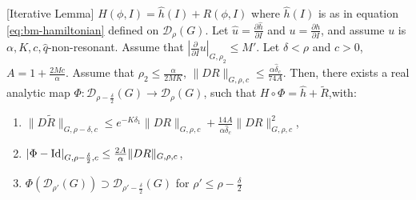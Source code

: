 \begin{theorem}\label{lemma:iterative}[Iterative Lemma] $H(\phi,I) = \hat h(I) + R(\phi,I)$ where $\hat h (I)$ is as in equation \ref{eq:bm-hamiltonian} defined on $\mathcal{D}_\rho(G)$. Let $\hat u = \frac{\partial \hat h }{\partial I}$ and $u = \frac{\partial h }{\partial I}$, and assume $u$ is $\alpha,K,c,\hat q$-non-resonant. Assume that $\left|\frac{\partial}{\partial I } u\right|_{G,\rho_2} \leq M'$. Let $\delta < \rho$ and $c > 0$, $A = 1 + \frac{2Mc}{\alpha}$. Assume that $\rho_2 \leq \frac{\alpha}{2MK}$, $\|DR\|_{G,\rho,c} \leq \frac{\alpha \hat \delta_c}{74A}$.
Then, there exists a real analytic map $\Phi:\mathcal{D}_{\rho-\frac{\delta}{2}}(G) \rightarrow \mathcal{D}_\rho(G)$, such that $H\circ \Phi = \hat h + \tilde{R}$,with:

\begin{enumerate}
\item $\|D\tilde{R}\|_{G,\rho-\delta,c} \leq e^{-K\delta_1}\|DR\|_{G,\rho,c} + \frac{14A}{\alpha\hat\delta_c} \|DR\|^2_{G,\rho,c}$,
\item $|\Phi-\text{Id}|_{G,\rho-\frac{\delta}{2},c} \leq \frac{2A}{\alpha}\|DR\|_{G,\rho,c}$,
\item $\Phi(\mathcal{D}_{\rho'}(G)) \supset \mathcal{D}_{\rho'-\frac{\delta}{2}}(G)$ for $\rho'\leq \rho-\frac{\delta}{2}$
\end{enumerate}

\end{theorem}

